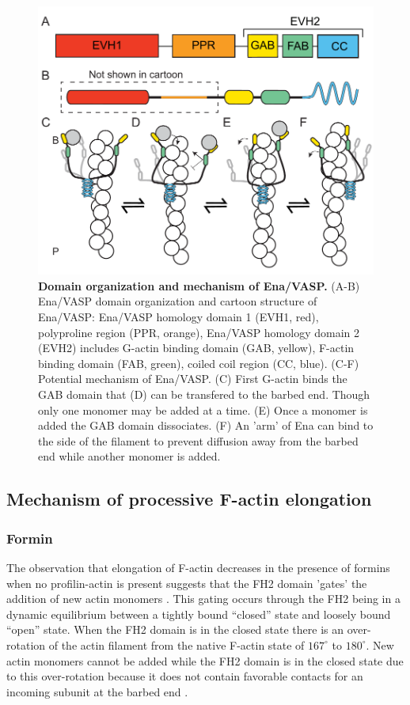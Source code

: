 \begin{figure}
\centering
\includegraphics[width=13cm]{img/ch01/Ena_mech.pdf}
\caption[Domain organization and mechanism of Ena/VASP.]{\textbf{Domain organization and mechanism of Ena/VASP.} (A-B) Ena/VASP domain organization and cartoon structure of Ena/VASP: Ena/VASP homology domain 1 (EVH1, red), polyproline region (PPR, orange), Ena/VASP homology domain 2 (EVH2) includes G-actin binding domain (GAB, yellow), F-actin binding domain (FAB, green), coiled coil region (CC, blue). (C-F) Potential mechanism of Ena/VASP. (C) First G-actin binds the GAB domain that (D) can be transfered to the barbed end. Though only one monomer may be added at a time. (E) Once a monomer is added the GAB domain dissociates. (F) An 'arm' of Ena can bind to the side of the filament to prevent diffusion away from the barbed end while another monomer is added.}
\label{fig:ena-domain}
\end{figure}

\subsection{Mechanism of processive F-actin elongation}\label{ena-formin mechanism}

\subsubsection{Formin}

The observation that elongation of F-actin decreases in the presence of formins when no profilin-actin is present suggests that the FH2 domain 'gates' the addition of new actin monomers \citep{kovar_control_2006,otomo_structural_2005,vavylonis_model_2006}. This gating occurs through the FH2 being in a dynamic equilibrium between a tightly bound “closed” state and loosely bound “open” state. When the FH2 domain is in the closed state there is an over-rotation of the actin filament from the native F-actin state of $167^{\circ}$ to $180^{\circ}$. New actin monomers cannot be added while the FH2 domain is in the closed state due to this over-rotation because it does not contain favorable contacts for an incoming subunit at the barbed end \citep{otomo_structural_2005}.

